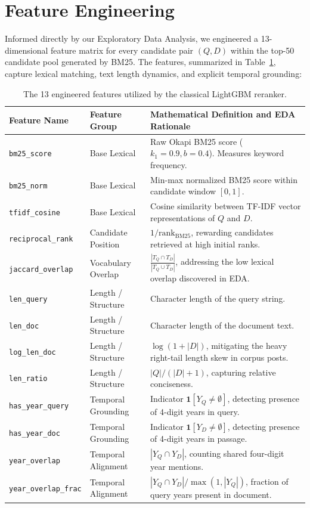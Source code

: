 \section{Feature Engineering}
\label{sec:features}

Informed directly by our Exploratory Data Analysis, we engineered a 13-dimensional feature matrix for every candidate pair $(Q, D)$ within the top-50 candidate pool generated by BM25. The features, summarized in Table~\ref{tab:features}, capture lexical matching, text length dynamics, and explicit temporal grounding:

\begin{table}[h]
\centering
\small
\caption{The 13 engineered features utilized by the classical LightGBM reranker.}
\label{tab:features}
\begin{tabular}{lp{4.2cm}p{6.8cm}}
\toprule
\textbf{Feature Name} & \textbf{Feature Group} & \textbf{Mathematical Definition and EDA Rationale} \\
\midrule
\texttt{bm25\_score} & Base Lexical & Raw Okapi BM25 score ($k_1=0.9, b=0.4$). Measures keyword frequency. \\
\texttt{bm25\_norm} & Base Lexical & Min-max normalized BM25 score within candidate window $[0, 1]$. \\
\texttt{tfidf\_cosine} & Base Lexical & Cosine similarity between TF-IDF vector representations of $Q$ and $D$. \\
\texttt{reciprocal\_rank} & Candidate Position & $1 / \text{rank}_{\text{BM25}}$, rewarding candidates retrieved at high initial ranks. \\
\addlinespace
\texttt{jaccard\_overlap} & Vocabulary Overlap & $\frac{|T_Q \cap T_D|}{|T_Q \cup T_D|}$, addressing the low lexical overlap discovered in EDA. \\
\texttt{len\_query} & Length / Structure & Character length of the query string. \\
\texttt{len\_doc} & Length / Structure & Character length of the document text. \\
\texttt{log\_len\_doc} & Length / Structure & $\log(1 + |D|)$, mitigating the heavy right-tail length skew in corpus posts. \\
\texttt{len\_ratio} & Length / Structure & $|Q| / (|D| + 1)$, capturing relative conciseness. \\
\addlinespace
\texttt{has\_year\_query} & Temporal Grounding & Indicator $\mathbf{1}[Y_Q \neq \emptyset]$, detecting presence of 4-digit years in query. \\
\texttt{has\_year\_doc} & Temporal Grounding & Indicator $\mathbf{1}[Y_D \neq \emptyset]$, detecting presence of 4-digit years in passage. \\
\texttt{year\_overlap} & Temporal Alignment & $|Y_Q \cap Y_D|$, counting shared four-digit year mentions. \\
\texttt{year\_overlap\_frac}& Temporal Alignment & $|Y_Q \cap Y_D| / \max(1, |Y_Q|)$, fraction of query years present in document. \\
\bottomrule
\end{tabular}
\end{table}

